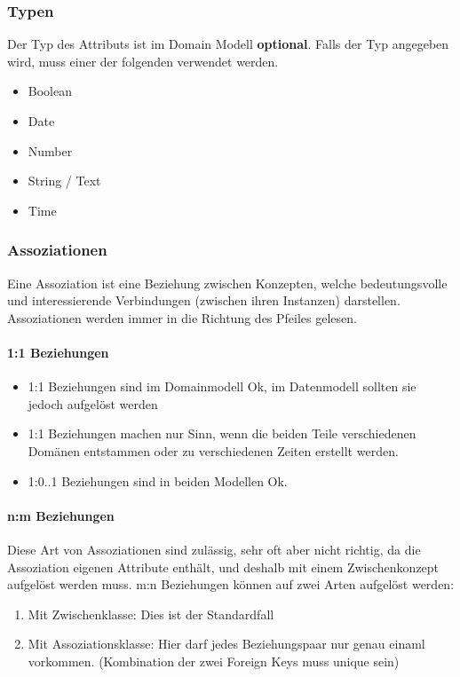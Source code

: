 \subsubsection{Typen}
Der Typ des Attributs ist im Domain Modell \textbf{optional}. Falls der Typ angegeben wird, muss einer der folgenden verwendet werden.
\begin{itemize}
	\item Boolean
	\item Date
	\item Number
	\item String / Text
	\item Time
\end{itemize}

\subsubsection{Assoziationen}
Eine Assoziation ist eine Beziehung zwischen Konzepten, welche bedeutungsvolle und interessierende Verbindungen (zwischen ihren Instanzen) darstellen. Assoziationen werden immer in die Richtung des Pfeiles gelesen.

\paragraph{1:1 Beziehungen}
\begin{itemize}
	\item 1:1 Beziehungen sind im Domainmodell Ok, im Datenmodell sollten sie jedoch aufgelöst werden
	\item 1:1 Beziehungen machen nur Sinn, wenn die beiden Teile verschiedenen Domänen entstammen oder zu verschiedenen Zeiten erstellt werden.
	\item 1:0..1 Beziehungen sind in beiden Modellen Ok.
\end{itemize}

\paragraph{n:m Beziehungen}
Diese Art von Assoziationen sind zulässig, sehr oft aber nicht richtig, da die Assoziation eigenen Attribute enthält, und deshalb mit einem Zwischenkonzept aufgelöst werden muss. m:n Beziehungen können auf zwei Arten aufgelöst werden:
\begin{enumerate}
	\item Mit Zwischenklasse: Dies ist der Standardfall
	\item Mit Assoziationsklasse: Hier darf jedes Beziehungspaar nur genau einaml vorkommen. (Kombination der zwei Foreign Keys muss unique sein)
\end{enumerate}

